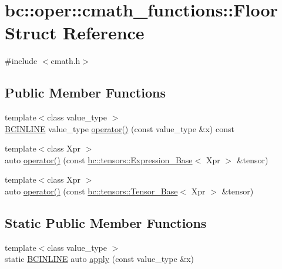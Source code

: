 \hypertarget{structbc_1_1oper_1_1cmath__functions_1_1Floor}{}\section{bc\+:\+:oper\+:\+:cmath\+\_\+functions\+:\+:Floor Struct Reference}
\label{structbc_1_1oper_1_1cmath__functions_1_1Floor}


{\ttfamily \#include $<$cmath.\+h$>$}

\subsection*{Public Member Functions}
\begin{DoxyCompactItemize}
\item 
{\footnotesize template$<$class value\+\_\+type $>$ }\\\hyperlink{common_8h_a6699e8b0449da5c0fafb878e59c1d4b1}{B\+C\+I\+N\+L\+I\+NE} value\+\_\+type \hyperlink{structbc_1_1oper_1_1cmath__functions_1_1Floor_a2723a0e43d0c54aafc95862154ac01fd}{operator()} (const value\+\_\+type \&x) const
\item 
{\footnotesize template$<$class Xpr $>$ }\\auto \hyperlink{structbc_1_1oper_1_1cmath__functions_1_1Floor_ac5fae14bd1b3ce422cd36191111c1493}{operator()} (const \hyperlink{classbc_1_1tensors_1_1Expression__Base}{bc\+::tensors\+::\+Expression\+\_\+\+Base}$<$ Xpr $>$ \&tensor)
\item 
{\footnotesize template$<$class Xpr $>$ }\\auto \hyperlink{structbc_1_1oper_1_1cmath__functions_1_1Floor_ae9fa29787d4f548261ab87da847e5805}{operator()} (const \hyperlink{classbc_1_1tensors_1_1Tensor__Base}{bc\+::tensors\+::\+Tensor\+\_\+\+Base}$<$ Xpr $>$ \&tensor)
\end{DoxyCompactItemize}
\subsection*{Static Public Member Functions}
\begin{DoxyCompactItemize}
\item 
{\footnotesize template$<$class value\+\_\+type $>$ }\\static \hyperlink{common_8h_a6699e8b0449da5c0fafb878e59c1d4b1}{B\+C\+I\+N\+L\+I\+NE} auto \hyperlink{structbc_1_1oper_1_1cmath__functions_1_1Floor_ae537e1a340d23a7fbfcee255344bd190}{apply} (const value\+\_\+type \&x)
\end{DoxyCompactItemize}


